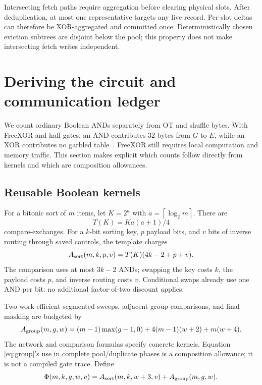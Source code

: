 \documentclass[11pt]{article}
\newcommand{\ceil}[1]{\left\lceil #1\right\rceil}
\begin{document}
Intersecting fetch paths require aggregation before clearing physical
slots. After deduplication, at most one representative targets any live
record. Per-slot deltas can therefore be XOR-aggregated and committed once.
Deterministically chosen eviction subtrees are disjoint below the pool;
this property does not make intersecting fetch writes independent.

\section{Deriving the circuit and communication ledger}
\label{sec:ledger}
We count ordinary Boolean ANDs separately from OT and shuffle bytes. With
FreeXOR and half gates, an AND contributes 32 bytes from $G$ to $E$, while an
XOR contributes no garbled table~\cite{halfgates}. FreeXOR still requires
local computation and memory traffic. This section makes explicit which
counts follow directly from kernels and which are composition allowances.

\subsection{Reusable Boolean kernels}
For a bitonic sort of $m$ items, let $K=2^a$ with
$a=\ceil{\log_2m}$. There are
\begin{equation}
 T(K)=Ka(a+1)/4
\end{equation}
compare-exchanges. For a $k$-bit sorting key, $p$ payload bits, and $v$ bits
of inverse routing through saved controls, the template charges
\begin{equation}
 A_{\rm sort}(m,k,p,v)=T(K)(4k-2+p+v).
\label{eq:sort}
\end{equation}
The comparison uses at most $3k-2$ ANDs; swapping the key costs $k$,
the payload costs $p$, and inverse routing costs $v$. Conditional swaps
already use one AND per bit: no additional factor-of-two discount applies.

Two work-efficient segmented sweeps, adjacent group comparisons, and final
masking are budgeted by
\begin{equation}
 A_{\rm group}(m,g,w)=(m-1)\max(g-1,0)
       +4(m-1)(w+2)+m(w+4).
\label{eq:group}
\end{equation}
The network and comparison formulas specify concrete kernels. Equation~
\eqref{eq:group}'s use in complete pool/duplicate phases is a composition
allowance; it is not a compiled gate trace. Define
\begin{equation}
 \Phi(m,k,g,w,v)=A_{\rm sort}(m,k,w+3,v)+A_{\rm group}(m,g,w).
\end{equation}
\end{document}
